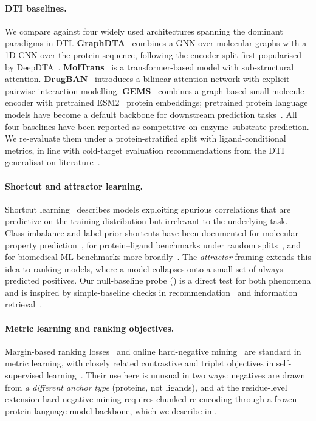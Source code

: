 \documentclass[11pt,a4paper]{article}
\begin{document}
\paragraph{DTI baselines.}
We compare against four widely used architectures spanning the dominant
paradigms in DTI. \textbf{GraphDTA}~\citep{nguyen2021graphdta} combines
a GNN over molecular graphs with a 1D CNN over the protein sequence,
following the encoder split first popularised by
DeepDTA~\citep{ozturk2018deepdta}. \textbf{MolTrans}~\citep{huang2021moltrans}
is a transformer-based model with sub-structural attention.
\textbf{DrugBAN}~\citep{bai2023drugban} introduces a bilinear attention
network with explicit pairwise interaction modelling. \textbf{GEMS}~\citep{wang2023gems}
combines a graph-based small-molecule encoder with pretrained
ESM2~\citep{lin2023esm2} protein embeddings; pretrained protein
language models have become a default backbone for downstream
prediction tasks~\citep{rives2021esm1b,elnaggar2022prottrans}. All four
baselines have been reported as competitive on enzyme--substrate
prediction. We re-evaluate them under a protein-stratified split with
ligand-conditional metrics, in line with cold-target evaluation
recommendations from the DTI generalisation
literature~\citep{pahikkala2015,jiang2020dtigeneralisation}.

\paragraph{Shortcut and attractor learning.}
Shortcut learning~\citep{geirhos2020shortcut} describes models
exploiting spurious correlations that are predictive on the training
distribution but irrelevant to the underlying task. Class-imbalance
and label-prior shortcuts have been documented for molecular
property prediction~\citep{nguyen2024dataleakage}, for protein--ligand
benchmarks under random splits~\citep{wallach2018mostligands,kapoor2023leakage},
and for biomedical ML benchmarks more
broadly~\citep{kapoor2023leakage}. The \emph{attractor} framing extends
this idea to ranking models, where a model collapses onto a small set
of always-predicted positives. Our null-baseline probe
() is a direct test for both phenomena and is
inspired by simple-baseline checks in
recommendation~\citep{rendle2019baselines} and information
retrieval~\citep{lin2019baseline}.

\paragraph{Metric learning and ranking objectives.}
Margin-based ranking losses~\citep{schroff2015facenet,sohn2016npair}
and online hard-negative mining~\citep{harwood2017smartmining,wu2017sampling}
are standard in metric learning, with closely related contrastive and
triplet objectives in self-supervised
learning~\citep{oord2018cpc,chen2020simclr}. Their use here is unusual
in two ways: negatives are drawn from \emph{a different anchor type}
(proteins, not ligands), and at the residue-level extension
hard-negative mining requires chunked re-encoding through a frozen
protein-language-model backbone, which we describe in
.
\end{document}
